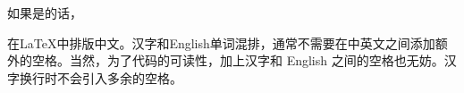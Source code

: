 \documentclass{ctexart}
\begin{document}
如果是的话，

在\LaTeX{}中排版中文。汉字和English单词混排，通常不需要在中英文之间添加额外的空格。当然，为了代码的可读性，加上汉字和 English 之间的空格也无妨。汉字换行时不会引入多余的空格。
\end{document}
